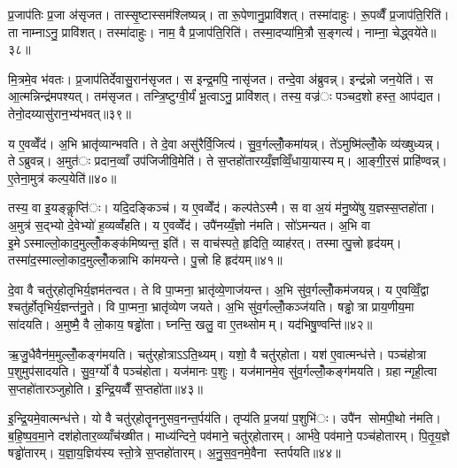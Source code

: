 
प्र॒जाप॑तिः प्र॒जा अ॑सृजत। तास्सृ॒ष्टास्सम॑श्लिष्यन्न्। ता रू॒पेणानु॒प्रावि॑शत्। तस्मा॑दाहुः। रू॒पव्वैँ प्र॒जाप॑ति॒रिति॑। ता नाम्नाऽनु॒ प्रावि॑शत्। तस्मा॑दाहुः। नाम॒ वै प्र॒जाप॑ति॒रिति॑। तस्मा॒दप्या॑मि॒त्रौ स॒ङ्गत्य॑। नाम्ना॒ चेद्ध्वये॑ते॥३८॥

मि॒त्रमे॒व भ॑वतः। प्र॒जाप॑तिर्देवासु॒रान॑सृजत। स इन्द्र॒मपि॒ नासृ॑जत। तन्दे॒वा अ॑ब्रुवन्न्। इन्द्र॑न्नो जन॒येति॑। स आ॒त्मन्निन्द्र॑मपश्यत्। तम॑सृजत। तन्त्रि॒ष्टुग्वी॒र्यं॑ भू॒त्वाऽनु॒ प्रावि॑शत्। तस्य॒ वज्र॑ः पञ्चद॒शो हस्त॒ आप॑द्यत। तेनो॒दय्यासु॑रान॒भ्य॑भवत्॥३९॥

य ए॒वव्वेँद॑। अ॒भि भ्रातृ॑व्यान्भवति। ते दे॒वा असु॑रैर्वि॒जित्य॑। सु॒व॒र्गल्लोँ॒कमा॑यन्न्। ते॑ऽमुष्मि॑ल्लोँ॒के व्य॑ख्षुध्यन्न्। तेऽब्रुवन्न्। अ॒मुत॑ः प्रदान॒व्वाँ उप॑जिजीवि॒मेति॑। ते स॒प्तहो॑तारय्यँ॒ज्ञव्विँ॒धाया॒यास्यम्। आ॒ङ्गी॒र॒सं प्राहि॑ण्वन्न्। ए॒तेना॒मुत्र॑ कल्प॒येति॑॥४०॥

तस्य॒ वा इ॒यङ्कॢप्ति॑ः। यदि॒दङ्किञ्च॑। य ए॒वव्वेँद॑। कल्प॑तेऽस्मै। स वा अ॒यं म॑नु॒ष्ये॑षु य॒ज्ञस्स॒प्तहो॑ता। अ॒मुत्र॑ स॒द्भ्यो दे॒वेभ्यो॑ ह॒व्यव्वँ॑हति। य ए॒वव्वेँद॑। उपै॑नय्यँ॒ज्ञो न॑मति। सो॑ऽमन्यत। अ॒भि वा इ॒मेऽस्माल्लो॒काद॒मुल्लोँ॒कङ्क॑मिष्यन्त॒ इति॑। स वाच॑स्पते॒ हृदिति॒ व्याह॑रत्। तस्मात्पु॒त्त्रो हृद॑यम्। तस्मा॑द॒स्माल्लो॒काद॒मुल्लोँ॒कन्नाभि का॑मयन्ते। पु॒त्त्रो हि हृद॑यम्॥४१॥


दे॒वा वै चतु॑र्‌होतृभिर्य॒ज्ञम॑तन्वत। ते वि पा॒प्मना॒ भ्रातृ॑व्ये॒णाज॑यन्त। अ॒भि सु॑व॒र्गल्लोँ॒कम॑जयन्न्। य ए॒वव्विँ॒द्वा श्चतु॑र्होतृभिर्य॒ज्ञन्त॑नु॒ते। वि पा॒प्मना॒ भ्रातृ॑व्येण जयते। अ॒भि सु॑व॒र्गल्लोँ॒कञ्ज॑यति। षड्ढोत्रा प्राय॒णीय॒मा सा॑दयति। अ॒मुष्मै॒ वै लो॒काय॒ षड्ढो॑ता। घ्नन्ति॒ खलु॒ वा ए॒तथ्सोमम्। यद॑भिषु॒ण्वन्ति॑॥४२॥

ऋ॒जु॒धैवैन॑म॒मुल्लोँ॒कङ्ग॑मयति। चतु॑र्‌होत्राऽऽति॒थ्यम्। यशो॒ वै चतु॑र्‌होता। यश॑ ए॒वात्मन्ध॑त्ते। पञ्च॑होत्रा प॒शुमुप॑सादयति। सु॒व॒र्ग्यो॑ वै पञ्च॑होता। यज॑मानः प॒शुः। यज॑मानमे॒व सु॑व॒र्गल्लोँ॒कङ्ग॑मयति। ग्रहान्गृही॒त्वा स॒प्तहो॑तारञ्जुहोति। इ॒न्द्रि॒यव्वैँ स॒प्तहो॑ता॥४३॥

इ॒न्द्रि॒यमे॒वात्मन्ध॑त्ते। यो वै चतु॑र्‌होतॄननुसव॒नन्त॒र्पय॑ति। तृप्य॑ति प्र॒जया॑ प॒शुभि॑ः। उपै॑न सोमपी॒थो न॑मति। ब॒हि॒ष्प॒व॒मा॒ने दश॑होतार॒व्व्याँच॑ख्षीत। माध्य॑न्दिने॒ पव॑माने॒ चतु॑र्‌होतारम्। आर्भ॑वे॒ पव॑माने॒ पञ्च॑होतारम्। पि॒तृ॒य॒ज्ञे षड्ढो॑तारम्। य॒ज्ञा॒य॒ज्ञिय॑स्य स्तो॒त्रे स॒प्तहो॑तारम्। अ॒नु॒स॒व॒नमे॒वैना स्तर्पयति॥४४॥

